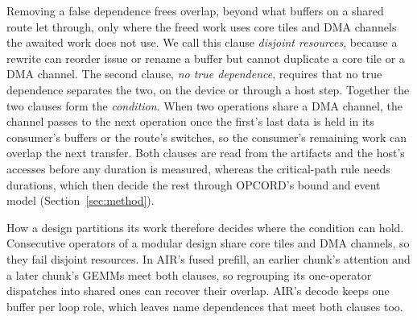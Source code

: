 Removing a false dependence frees overlap, beyond what buffers on a shared route let through, only where the freed work uses core tiles and DMA channels the awaited work does not use.
We call this clause \emph{disjoint resources}, because a rewrite can reorder issue or rename a buffer but cannot duplicate a core tile or a DMA channel.
The second clause, \emph{no true dependence}, requires that no true dependence separates the two, on the device or through a host step.
Together the two clauses form the \emph{condition}.
When two operations share a DMA channel, the channel passes to the next operation once the first's last data is held in its consumer's buffers or the route's switches, so the consumer's remaining work can overlap the next transfer.
Both clauses are read from the artifacts and the host's accesses before any duration is measured, whereas the critical-path rule needs durations, which then decide the rest through OPCORD's bound and event model (Section~\ref{sec:method}).

How a design partitions its work therefore decides where the condition can hold.
Consecutive operators of a modular design share core tiles and DMA channels, so they fail disjoint resources.
In AIR's fused prefill, an earlier chunk's attention and a later chunk's GEMMs meet both clauses, so regrouping its one-operator dispatches into shared ones can recover their overlap.
AIR's decode keeps one buffer per loop role, which leaves name dependences that meet both clauses too.

